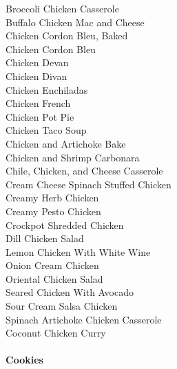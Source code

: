 \documentclass[11pt, twoside, openany]{book}
\begin{document}
Broccoli Chicken Casserole\hrulefill\pageref{broccoli-chicken-casserole}\\
Buffalo Chicken Mac and Cheese\hrulefill\pageref{buffalo-chicken-mac-and-cheese}\\
Chicken Cordon Bleu, Baked\hrulefill\pageref{chicken-cordon-bleu,-baked}\\
Chicken Cordon Bleu\hrulefill\pageref{chicken-cordon-bleu}\\
Chicken Devan\hrulefill\pageref{chicken-devan}\\
Chicken Divan\hrulefill\pageref{chicken-divan}\\
Chicken Enchiladas\hrulefill\pageref{chicken-enchiladas}\\
Chicken French\hrulefill\pageref{chicken-french}\\
Chicken Pot Pie\hrulefill\pageref{chicken-pot-pie}\\
Chicken Taco Soup\hrulefill\pageref{chicken-taco-soup}\\
Chicken and Artichoke Bake\hrulefill\pageref{chicken-and-artichoke-bake}\\
Chicken and Shrimp Carbonara\hrulefill\pageref{chicken-and-shrimp-carbonara}\\
Chile, Chicken, and Cheese Casserole\hrulefill\pageref{chile,-chicken,-and-cheese-casserole}\\
Cream Cheese Spinach Stuffed Chicken\hrulefill\pageref{cream-cheese-spinach-stuffed-chicken}\\
Creamy Herb Chicken\hrulefill\pageref{creamy-herb-chicken}\\
Creamy Pesto Chicken\hrulefill\pageref{creamy-pesto-chicken}\\
Crockpot Shredded Chicken\hrulefill\pageref{crockpot-shredded-chicken}\\
Dill Chicken Salad\hrulefill\pageref{dill-chicken-salad}\\
Lemon Chicken With White Wine\hrulefill\pageref{lemon-chicken-with-white-wine}\\
Onion Cream Chicken\hrulefill\pageref{onion-cream-chicken}\\
Oriental Chicken Salad\hrulefill\pageref{oriental-chicken-salad}\\
Seared Chicken With Avocado\hrulefill\pageref{seared-chicken-with-avocado}\\
Sour Cream Salsa Chicken\hrulefill\pageref{sour-cream-salsa-chicken}\\
Spinach Artichoke Chicken Casserole\hrulefill\pageref{spinach-artichoke-chicken-casserole}\\
Coconut Chicken Curry\hrulefill\pageref{coconut-chicken-curry}\\
{~\vspace{2mm}\\ \Large \textbf{Cookies}}\hfill\textbf{\pageref{cookies}}
\end{document}
